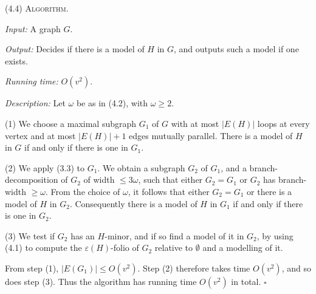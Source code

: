 \stmt
(4.4) \textsc{Algorithm}.

\textit{Input:} A graph $G$.

\textit{Output:} Decides if there is a model of $H$ in $G$, and outputs such a model if one exists.

\textit{Running time:} $O(v^2)$.

\textit{Description:} Let $\omega$ be as in (4.2), with $\omega \ge 2$.

\hspace*{12pt}(1) We choose a maximal subgraph $G_1$ of $G$ with at most $|E(H)|$ loops at every vertex and at most $|E(H)| + 1$ edges mutually parallel. There is a model of $H$ in $G$ if and only if there is one in $G_1$.

\hspace*{12pt}(2) We apply (3.3) to $G_1$. We obtain a subgraph $G_2$ of $G_1$, and a branch-decomposition of $G_2$ of width $\le 3\omega$, such that either $G_2 = G_1$ or $G_2$ has branch-width $\ge \omega$. From the choice of $\omega$, it follows that either $G_2 = G_1$ or there is a model of $H$ in $G_2$. Consequently there is a model of $H$ in $G_1$ if and only if there is one in $G_2$.

\hspace*{12pt}(3) We test if $G_2$ has an $H$-minor, and if so find a model of it in $G_2$, by using (4.1) to compute the $\varepsilon(H)$-folio of $G_2$ relative to $\emptyset$ and a modelling of it.

From step (1), $|E(G_1)| \le O(v^2)$. Step (2) therefore takes time $O(v^2)$, and so does step (3). Thus the algorithm has running time $O(v^2)$ in total. $\square$
